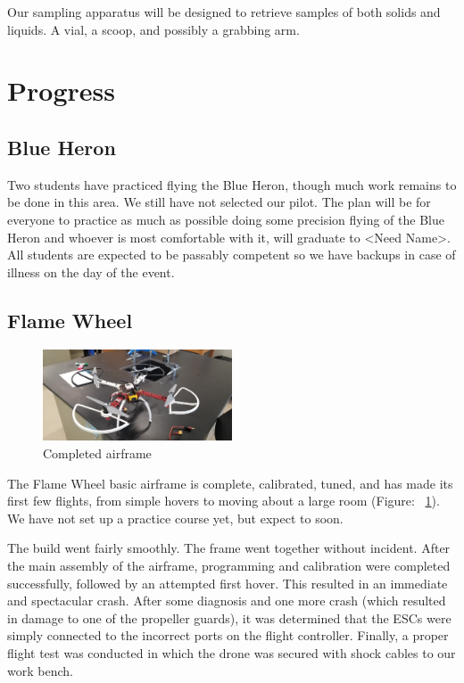 Our sampling apparatus will be designed to retrieve samples of both solids and liquids. A vial, a scoop, and possibly a grabbing arm.

\section{Progress}

\subsection{Blue Heron}

Two students have practiced flying the Blue Heron, though much work remains to be done in this area. We still have not selected our pilot. The plan will be for everyone to practice as much as possible doing some precision flying of the Blue Heron and whoever is most comfortable with it, will graduate to <Need Name>. All students are expected to be passably competent so we have backups in case of illness on the day of the event.

\subsection{Flame Wheel}

\begin{figure}[!htbp]
\centering 
        \includegraphics[width=0.5\textwidth]{figs/flamewheel1.jpg}
\caption[Completed airframe]{Completed airframe}
\label{fig:airframe} 
\end{figure}

The Flame Wheel basic airframe is complete, calibrated, tuned, and has made its first few flights, from simple hovers to moving about a large room (Figure: ~\ref{fig:airframe}). We have not set up a practice course yet, but expect to soon.

The build went fairly smoothly. The frame went together without incident. After the main assembly of the airframe, programming and calibration were completed successfully, followed by an attempted first hover. This resulted in an immediate and spectacular crash. After some diagnosis and one more crash (which resulted in damage to one of the propeller guards), it was determined that the ESCs were simply connected to the incorrect ports on the flight controller. Finally, a proper flight test was conducted in which the drone was secured with shock cables to our work bench.

